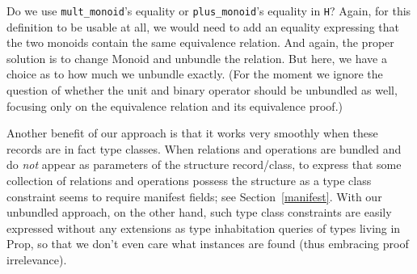 \documentclass[a4paper,10pt,runningheads]{llncs}
\begin{document}
Do we use \lstinline|mult_monoid|'s equality or \lstinline|plus_monoid|'s equality in \lstinline|H|?
Again, for this definition to be usable at all, we would need to add an equality expressing that the
two monoids contain the same equivalence relation. And again, the proper solution is to change
Monoid and unbundle the relation. But here, we have a choice as to how much we unbundle exactly.
(For the moment we ignore the question of whether the unit and binary operator should be unbundled
as well, focusing only on the equivalence relation and its equivalence proof.)



% 

Another benefit of our approach is that it works very smoothly when these records are in fact type
classes. When relations and operations are bundled and do \emph{not} appear as parameters of the
structure record/class, to express that some collection of relations and
operations possess the structure as a type class constraint seems to require manifest fields; see
Section~\ref{manifest}. With
our unbundled approach, on the other hand, such type class constraints are easily expressed without
any extensions as type inhabitation queries
of types living in Prop, so that we don't even care what instances are found (thus embracing proof
irrelevance).
\end{document}
